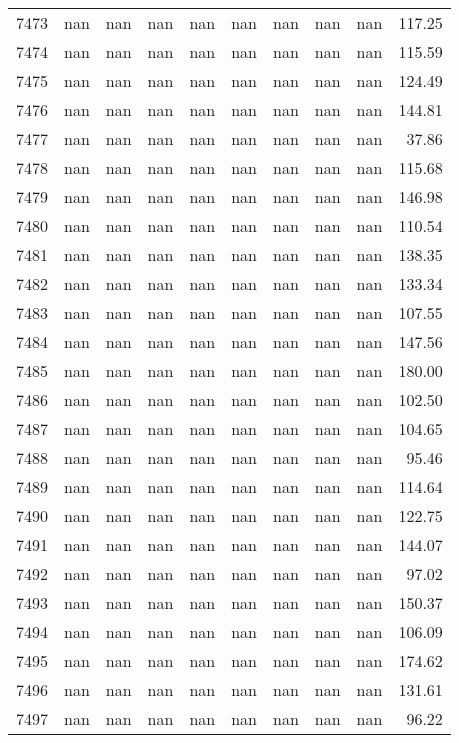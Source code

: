 \begin{tabular}{lrrrrrrrrr}
7473 & nan & nan & nan & nan & nan & nan & nan & nan & 117.25 \\
7474 & nan & nan & nan & nan & nan & nan & nan & nan & 115.59 \\
7475 & nan & nan & nan & nan & nan & nan & nan & nan & 124.49 \\
7476 & nan & nan & nan & nan & nan & nan & nan & nan & 144.81 \\
7477 & nan & nan & nan & nan & nan & nan & nan & nan & 37.86 \\
7478 & nan & nan & nan & nan & nan & nan & nan & nan & 115.68 \\
7479 & nan & nan & nan & nan & nan & nan & nan & nan & 146.98 \\
7480 & nan & nan & nan & nan & nan & nan & nan & nan & 110.54 \\
7481 & nan & nan & nan & nan & nan & nan & nan & nan & 138.35 \\
7482 & nan & nan & nan & nan & nan & nan & nan & nan & 133.34 \\
7483 & nan & nan & nan & nan & nan & nan & nan & nan & 107.55 \\
7484 & nan & nan & nan & nan & nan & nan & nan & nan & 147.56 \\
7485 & nan & nan & nan & nan & nan & nan & nan & nan & 180.00 \\
7486 & nan & nan & nan & nan & nan & nan & nan & nan & 102.50 \\
7487 & nan & nan & nan & nan & nan & nan & nan & nan & 104.65 \\
7488 & nan & nan & nan & nan & nan & nan & nan & nan & 95.46 \\
7489 & nan & nan & nan & nan & nan & nan & nan & nan & 114.64 \\
7490 & nan & nan & nan & nan & nan & nan & nan & nan & 122.75 \\
7491 & nan & nan & nan & nan & nan & nan & nan & nan & 144.07 \\
7492 & nan & nan & nan & nan & nan & nan & nan & nan & 97.02 \\
7493 & nan & nan & nan & nan & nan & nan & nan & nan & 150.37 \\
7494 & nan & nan & nan & nan & nan & nan & nan & nan & 106.09 \\
7495 & nan & nan & nan & nan & nan & nan & nan & nan & 174.62 \\
7496 & nan & nan & nan & nan & nan & nan & nan & nan & 131.61 \\
7497 & nan & nan & nan & nan & nan & nan & nan & nan & 96.22 \\

\end{tabular}
